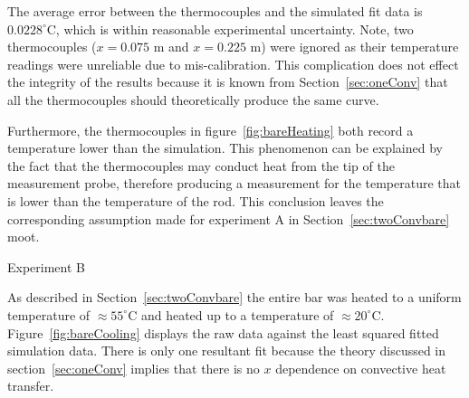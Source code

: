 \documentclass[10pt,aps,prb,twocolumn, nofootinbib]{revtex4-1}
\begin{document}
\noindent The average error between the thermocouples and the simulated fit data is $0.0228 ^\circ$C, which is within reasonable experimental uncertainty. Note, two thermocouples ($x = 0.075 \text{ m}$ and $x = 0.225 \text{ m}$) were ignored as their temperature readings were unreliable due to mis-calibration. This complication does not effect the integrity of the results because it is known from Section~\ref{sec:oneConv} that all the thermocouples should theoretically produce the same curve. 

Furthermore, the thermocouples in figure~\ref{fig:bareHeating} both record a temperature lower than the simulation. This phenomenon can be explained by the fact that the thermocouples may conduct heat from the tip of the measurement probe, therefore producing a measurement for the temperature that is lower than the temperature of the rod. This conclusion leaves the corresponding assumption made for experiment A in Section~\ref{sec:twoConvbare} moot. 

\begin{description}
\item[Experiment B]
\end{description}

As described in Section~\ref{sec:twoConvbare} the entire bar was heated to a uniform temperature of $\approx 55^\circ \text{C}$ and heated up to a temperature of $\approx 20^\circ \text{C}$. Figure~\ref{fig:bareCooling} displays the raw data against the least squared fitted simulation data. There is only one resultant fit because the theory discussed in section~\ref{sec:oneConv} implies that there is no $x$ dependence on convective heat transfer.   
\end{document}
